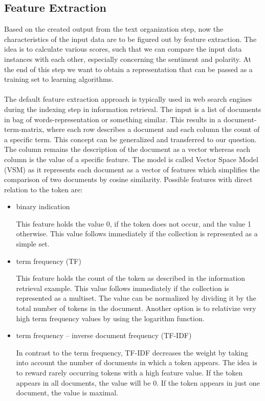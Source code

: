 \documentclass[article,type=msc,colorback,accentcolor=tud7b]{tudthesis}
\begin{document}
  \subsection{Feature Extraction}
    Based on the created output from the text organization step, now the characteristics of the input data are to be figured out by feature extraction. The idea is to calculate various scores, such that we can compare the input data instances with each other, especially concerning the sentiment and polarity. At the end of this step we want to obtain a representation that can be passed as a training set to learning algorithms. \\\\
    The default feature extraction approach is typically used in web search engines during the indexing step in information retrieval. The input is a list of documents in bag of words-representation or something similar. This results in a document-term-matrix, where each row describes a document and each column the count of a specific term. This concept can be generalized and transferred to our question. The column remains the description of the document as a vector whereas each column is the value of a specific feature. The model is called Vector Space Model (VSM) as it represents each document as a vector of features which simplifies the comparison of two documents by cosine similarity. Possible features with direct relation to the token are:
    \begin{itemize}
      \item binary indication
      
        This feature holds the value 0, if the token does not occur, and the value 1 otherwise. This value follows immediately if the collection is represented as a simple set.
      \item term frequency (TF)
      
        This feature holds the count of the token as described in the information retrieval example. This value follows immediately if the collection is represented as a multiset. The value can be normalized by dividing it by the total number of tokens in the document. Another option is to relativize very high term frequency values by using the logarithm function.
      \item term frequency – inverse document frequency (TF-IDF)
      
        In contrast to the term frequency, TF-IDF decreases the weight by taking into account the number of documents in which a token appears. The idea is to reward rarely occurring tokens with a high feature value. If the token appears in all documents, the value will be 0. If the token appears in just one document, the value is maximal.
    \end{itemize}
\end{document}
